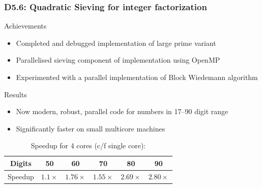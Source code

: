 \documentclass{beamer}
\begin{document}
\begin{frame}
  \frametitle{D5.6: Quadratic Sieving for integer factorization}
    \begin{block}{Achievements}
      \begin{itemize}
      \item Completed and debugged implementation of large prime variant
      \item Parallelised sieving component of implementation using OpenMP
      \item Experimented with a parallel implementation of Block Wiedemann algorithm
      \end{itemize}
\end{block}
\begin{block}{Results}

      \begin{itemize}
      \item Now modern, robust, parallel code for numbers in
        17--90 digit range \pause
      \item Significantly faster on small multicore machines
      \end{itemize}
\vspace{-1.5em}
      \begin{center}
        \begin{table}
          \caption{Speedup for 4 cores (c/f single core): }
        \begin{tabular}{c|ccccc}
        \toprule
            {Digits} & 50 & 60 & 70 & 80 & 90\\
            \midrule
                {Speedup} & $1.1\times$ & $1.76\times$ & $1.55\times$ & $2.69\times$ & $2.80\times$\\
                \bottomrule
      \end{tabular}
\end{table}
      \end{center}
    \end{block}

\end{frame}
\end{document}

